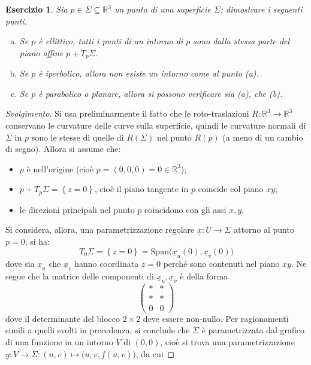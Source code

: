\documentclass[12pt]{scrartcl}
\theoremstyle{style}
\newtheorem{esercizio}{Esercizio}[section]
\newenvironment{svolgimento}{\renewcommand\qedsymbol{$\blacksquare$}\begin{proof}[Svolgimento]}{\end{proof}}
\numberwithin{equation}{subsection}
\begin{document}
\begin{esercizio}
Sia $p \in \Sigma \subseteq \mathbb{R}^3$ un punto di una superficie $\Sigma$; dimostrare i seguenti punti.
\begin{enumerate}[(a).]
	\item Se $p$ \`e ellittico, tutti i punti di un intorno di $p$ sono dalla stessa parte del piano affine $p + T_p \Sigma$.
	\item Se $p$ \`e iperbolico, allora non esiste un intorno come al punto (a).
	\item Se $p$ \`e parabolico o planare, allora si possono verificare sia (a), che (b).
\end{enumerate}
\end{esercizio}
\begin{svolgimento}
	Si usa preliminarmente il fatto che le roto-traslazioni $R: \mathbb{R}^3 \to \mathbb{R}^3$ conservano le curvature delle curve sulla superficie, quindi le curvature normali di $\Sigma$ in $p$ sono le stesse di quelle di $R(\Sigma)$ nel punto $R(p)$ (a meno di un cambio di segno).
	Allora si assume che:
	\begin{itemize}
		\item $p$ \`e nell'origine (cio\`e $p = (0,0,0) = 0 \in \mathbb{R}^3$);
		\item $p+ T_p\Sigma = \left\{ z=0 \right\} $, cio\`e il piano tangente in $p$ coincide col piano $xy$;
		\item le direzioni principali nel punto $p$ coincidono con gli assi $x,y$.
	\end{itemize}
	Si considera, allora, una parametrizzazione regolare $\underline{x}: U \to \Sigma$ attorno al punto $p= 0$; si ha:
	\[
	T_0 \Sigma = \left\{ z=0 \right\} = \mathrm{Span} \big(\underline{x}_u (0), \underline{x}_v (0)\big)
	\] 
	dove sia $\underline{x}_u$ che $\underline{x}_v$ hanno coordinata $z=0$ perch\'e sono contenuti nel piano $xy$. 
	Ne segue che la matrice delle componenti di $\underline{x}_u, \underline{x}_v$ \`e della forma
	\[
		\begin{pmatrix} * & *\\ *&*\\0&0 \end{pmatrix} 
	\] 
	dove il determinante del blocco $2 \times 2$ deve essere non-nullo.
	Per ragionamenti simili a quelli svolti in precedenza, si conclude che $\Sigma$ \`e parametrizzata dal grafico di una funzione in un intorno $V$ di $(0,0)$, cio\`e si trova una parametrizzazione $\underline{y}: V \to \Sigma : (u,v) \longmapsto \big(u,v,f(u,v)\big)$, da cui

\end{svolgimento}
\end{document}
